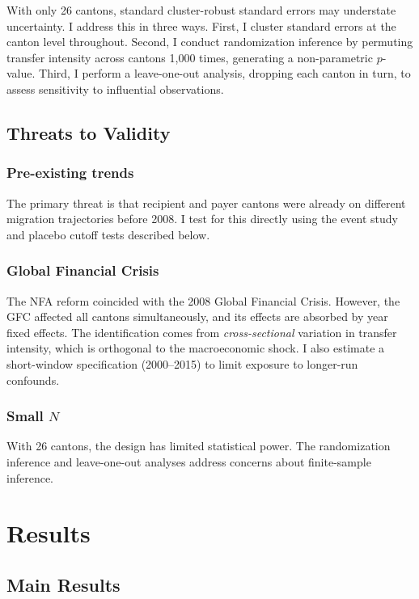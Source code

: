 \documentclass[12pt]{article}
\begin{document}
With only 26 cantons, standard cluster-robust standard errors may understate uncertainty. I address this in three ways. First, I cluster standard errors at the canton level throughout. Second, I conduct randomization inference by permuting transfer intensity across cantons 1,000 times, generating a non-parametric $p$-value. Third, I perform a leave-one-out analysis, dropping each canton in turn, to assess sensitivity to influential observations.


\subsection{Threats to Validity}

\subsubsection*{Pre-existing trends} The primary threat is that recipient and payer cantons were already on different migration trajectories before 2008. I test for this directly using the event study and placebo cutoff tests described below.

\subsubsection*{Global Financial Crisis} The NFA reform coincided with the 2008 Global Financial Crisis. However, the GFC affected all cantons simultaneously, and its effects are absorbed by year fixed effects. The identification comes from \emph{cross-sectional} variation in transfer intensity, which is orthogonal to the macroeconomic shock. I also estimate a short-window specification (2000--2015) to limit exposure to longer-run confounds.

\subsubsection*{Small $N$} With 26 cantons, the design has limited statistical power. The randomization inference and leave-one-out analyses address concerns about finite-sample inference.


\section{Results}
\label{sec:results}

\subsection{Main Results}
\end{document}

